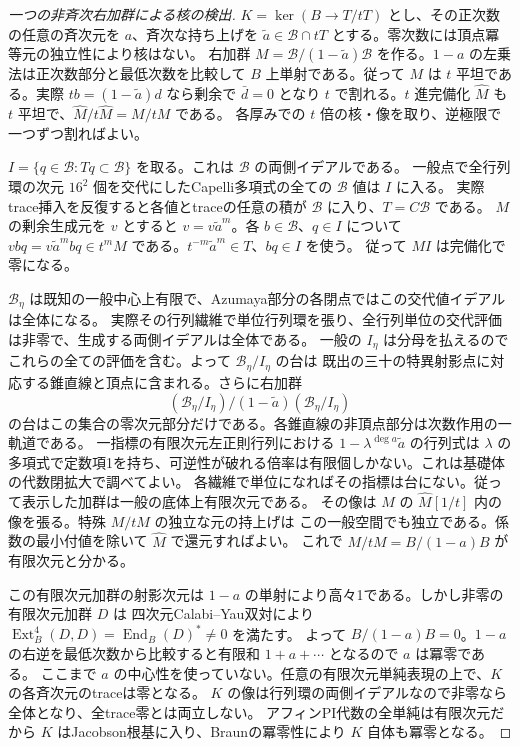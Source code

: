 \begin{proof}[一つの非斉次右加群による核の検出]
$K=\ker(B\to T/tT)$ とし、その正次数の任意の斉次元を $a$、斉次な持ち上げを
$\tilde a\in\mathcal B\cap tT$ とする。零次数には頂点冪等元の独立性により核はない。
右加群 $M=\mathcal B/(1-\tilde a)\mathcal B$ を作る。$1-a$ の左乗法は正次数部分と最低次数を比較して
$B$ 上単射である。従って $M$ は $t$ 平坦である。実際 $tb=(1-\tilde a)d$ なら剰余で $\bar d=0$ となり
$t$ で割れる。$t$ 進完備化 $\widehat M$ も $t$ 平坦で、$\widehat M/t\widehat M=M/tM$ である。
各厚みでの $t$ 倍の核・像を取り、逆極限で一つずつ割ればよい。

$I=\{q\in\mathcal B:Tq\subset\mathcal B\}$ を取る。これは $\mathcal B$ の両側イデアルである。
一般点で全行列環の次元 $16^2$ 個を交代にしたCapelli多項式の全ての $\mathcal B$ 値は $I$ に入る。
実際trace挿入を反復すると各値とtraceの任意の積が $\mathcal B$ に入り、$T=C\mathcal B$ である。
$M$ の剰余生成元を $v$ とすると $v=v\tilde a^m$。各 $b\in\mathcal B$、$q\in I$ について
$v bq=v\tilde a^m bq\in t^m M$ である。$t^{-m}\tilde a^m\in T$、$bq\in I$ を使う。
従って $MI$ は完備化で零になる。

$\mathcal B_\eta$ は既知の一般中心上有限で、Azumaya部分の各閉点ではこの交代値イデアルは全体になる。
実際その行列繊維で単位行列環を張り、全行列単位の交代評価は非零で、生成する両側イデアルは全体である。
一般の $I_\eta$ は分母を払えるのでこれらの全ての評価を含む。よって $\mathcal B_\eta/I_\eta$ の台は
既出の三十の特異射影点に対応する錐直線と頂点に含まれる。さらに右加群
\[
        (\mathcal B_\eta/I_\eta)/(1-\tilde a)(\mathcal B_\eta/I_\eta)
\]
の台はこの集合の零次元部分だけである。各錐直線の非頂点部分は次数作用の一軌道である。
一指標の有限次元左正則行列における $1-\lambda^{\deg a}\tilde a$ の行列式は
$\lambda$ の多項式で定数項1を持ち、可逆性が破れる倍率は有限個しかない。これは基礎体の代数閉拡大で調べてよい。
各繊維で単位になればその指標は台にない。従って表示した加群は一般の底体上有限次元である。
その像は $M$ の $\widehat M[1/t]$ 内の像を張る。特殊 $M/tM$ の独立な元の持上げは
この一般空間でも独立である。係数の最小付値を除いて $\widehat M$ で還元すればよい。
これで $M/tM=B/(1-a)B$ が有限次元と分かる。

この有限次元加群の射影次元は $1-a$ の単射により高々1である。しかし非零の有限次元加群 $D$ は
四次元Calabi--Yau双対により $\operatorname{Ext}^4_B(D,D)=\operatorname{End}_B(D)^*\ne0$ を満たす。
よって $B/(1-a)B=0$。$1-a$ の右逆を最低次数から比較すると有限和 $1+a+\cdots$ となるので $a$ は冪零である。
ここまで $a$ の中心性を使っていない。任意の有限次元単純表現の上で、$K$ の各斉次元のtraceは零となる。
$K$ の像は行列環の両側イデアルなので非零なら全体となり、全trace零とは両立しない。
アフィンPI代数の全単純は有限次元だから $K$ はJacobson根基に入り、Braunの冪零性により $K$ 自体も冪零となる。
\end{proof}

